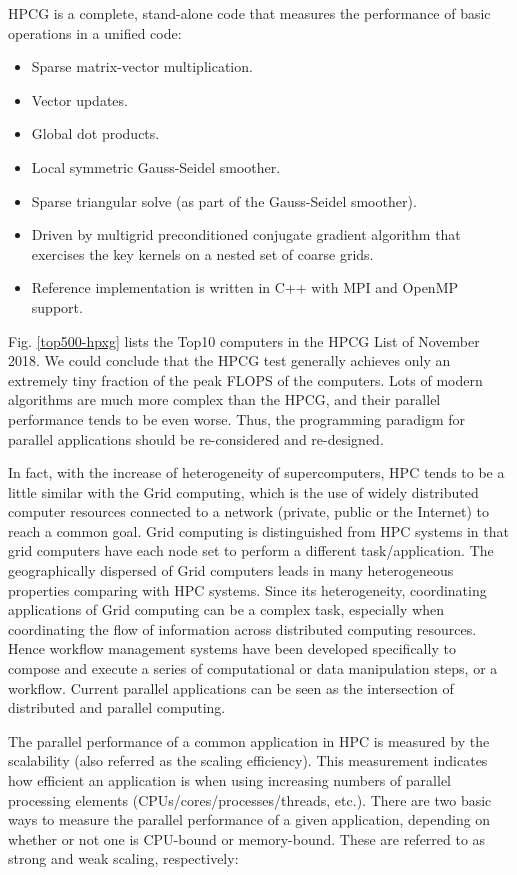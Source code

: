 HPCG is a complete, stand-alone code that measures the performance of basic operations in a unified code:

\begin{itemize}
	\item Sparse matrix-vector multiplication.
	\item Vector updates.
	\item Global dot products.
	\item Local symmetric Gauss-Seidel smoother.
	\item Sparse triangular solve (as part of the Gauss-Seidel smoother).
	\item Driven by multigrid preconditioned conjugate gradient algorithm that exercises the key kernels on a nested set of coarse grids.
	\item Reference implementation is written in C++ with MPI and OpenMP support.
\end{itemize}

Fig. \ref{top500-hpxg} lists the Top10 computers in the HPCG List of November 2018.  We could conclude that the HPCG test generally achieves only an extremely tiny fraction of the peak FLOPS of the computers. Lots of modern algorithms are much more complex than the HPCG, and their parallel performance tends to be even worse. Thus,  the programming paradigm for parallel applications should be re-considered and re-designed.

In fact, with the increase of heterogeneity of supercomputers, HPC tends to be a little similar with the Grid computing, which is the use of widely distributed computer resources connected to a network (private, public or the Internet) to reach a common goal. Grid computing is distinguished from HPC systems in that grid computers have each node set to perform a different task/application. The geographically dispersed of Grid computers leads in many heterogeneous properties comparing with HPC systems. Since its heterogeneity, coordinating applications of Grid computing can be a complex task, especially when coordinating the flow of information across distributed computing resources. Hence workflow management systems have been developed specifically to compose and execute a series of computational or data manipulation steps, or a workflow. Current parallel applications can be seen as the intersection of distributed and parallel computing.

The parallel performance of a common application in HPC is measured by the scalability (also referred as the scaling efficiency). This measurement indicates how efficient an application is when using increasing numbers of parallel processing elements (CPUs/cores/processes/threads, etc.). There are two basic ways to measure the parallel performance of a given application, depending on whether or not one is CPU-bound or memory-bound. These are referred to as strong and weak scaling, respectively: 


